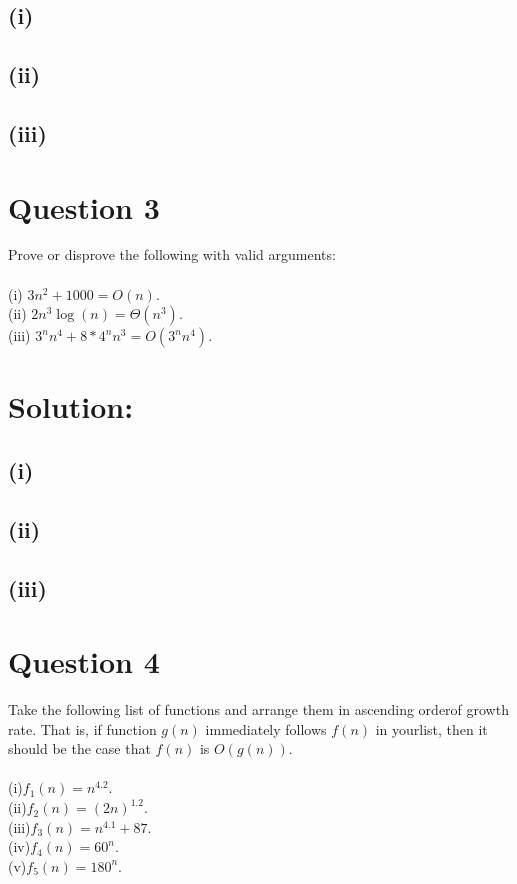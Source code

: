 \documentclass[a4paper,12pt]{article}
\begin{document}
\subsection*{(i)} 
\subsection*{(ii)} 
\subsection*{(iii)} 

\section*{Question 3}
 Prove or disprove the following with valid arguments:\\\\(i) $3n^{2}+ 1000 =O(n)$.
\\(ii) $2n^{3}\log ({n}) = \Theta(n^{3})$.
\\(iii) $3^{n}n^{4}+ 8 * 4^{n}n^{3}=O(3^{n}n^{4})$.
\section*{Solution:}
\subsection*{(i)} 
\subsection*{(ii)} 
\subsection*{(iii)} 


\section*{Question 4}
Take the following list of functions and arrange them in ascending orderof growth rate.  That is, if function $g(n)$ immediately follows $f(n)$ in yourlist, then it should be the case that $f(n)$ is $O(g(n))$.\\
\\(i)$f_1(n) =n^{4.2}$.
\\(ii)$f_2(n) = (2n)^{1.2}$.
\\(iii)$f_3(n) =n^{4.1}+ 87$.
\\(iv)$f_4(n) = 60^{n}$.
\\(v)$f_5(n) = 180^{n}$.
\end{document}
